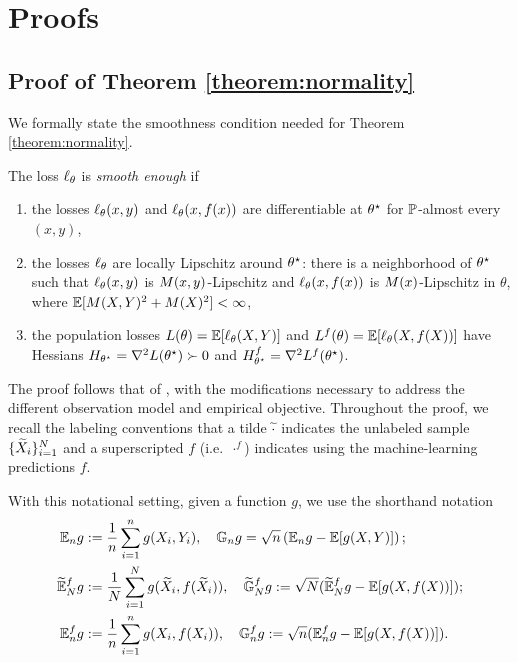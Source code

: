 
\section{Proofs}

\subsection{Proof of Theorem \ref{theorem:normality}}
\label{sec:proof-normality}

We formally state the smoothness condition needed for Theorem \ref{theorem:normality}.

\begin{definition}
  \label{definition:smooth-enough}
  The loss $\loss_\theta$ is \emph{smooth enough} if
  \begin{enumerate}[label=(\roman*),leftmargin=1.5em]
  \item  
  \label{item:loss-differentiability} the losses
    $\loss_\theta(x, y)$ and $\loss_\theta(x, f(x))$ are
    differentiable at $\theta\opt$ for $\P$-almost
    every $(x, y)$,
  \item \label{item:locally-lipschitz}
    the losses $\loss_\theta$ are
    locally Lipschitz around $\theta\opt$: there is a neighborhood
    of $\theta\opt$ such that
    $\loss_\theta(x, y)$ is $\lipobj(x, y)$-Lipschitz
    and $\loss_{\theta}(x, f(x))$ is $\lipobj(x)$-Lipschitz in $\theta$,
    where $\E[\lipobj(X, Y)^2 + \lipobj(X)^2] < \infty$,
  \item the population losses
    $L(\theta) = \E[\loss_\theta(X, Y)]$ and
    $L^f(\theta) = \E[\loss_\theta(X, f(X))]$ have Hessians $H_{\theta\opt} = \nabla^2 L(\theta\opt) \succ 0$ and
    $H_{\theta\opt}^f = \nabla^2 L^f(\theta\opt)$.
  \end{enumerate}
\end{definition}


The proof follows that of \citet[Theorem
  5.23]{VanDerVaart98}, with the modifications necessary
to address the different observation model and empirical objective.  Throughout the proof, we recall the labeling
conventions that a tilde $\wt{\cdot}$ indicates the unlabeled sample
$\{\wt{X}_i\}_{i = 1}^N$ and a superscripted $f$ (i.e.\ $\cdot^f$) indicates
using the machine-learning predictions $f$.

With this notational setting,
given a function $g$, we use the shorthand notation
\begin{align}
  \E_n g &:= \frac{1}{n} \sum_{i=1}^n g(X_i,Y_i), \quad \GG_n g = \sqrt{n}\left(\E_n g - \E[g(X,Y)]\right); \label{eq:Gn}\\
  \widetilde \E_N^f g &:= \frac{1}{N} \sum_{i=1}^N g(\widetilde X_i, f(\widetilde X_i)),\quad \widetilde \GG_N^f g := \sqrt{N} ( \widetilde \E_N^f g - \E[g(X,f(X))]); \label{eq:GNf}\\
  \E_n^f g &:= \frac{1}{n} \sum_{i=1}^n g( X_i, f(X_i)), \quad \GG_n^f g := \sqrt{n}  (\E_n^f g - \E[g(X,f(X))]) \label{eq:Gnf}.
\end{align}

